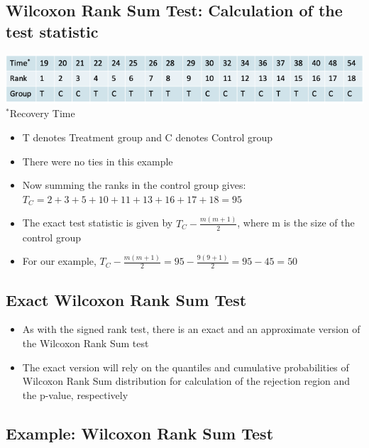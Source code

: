 \documentclass[
]{book}
\providecommand{\tightlist}{%
  \setlength{\itemsep}{0pt}\setlength{\parskip}{0pt}}
\begin{document}
\hypertarget{wilcoxon-rank-sum-test-calculation-of-the-test-statistic}{%
\subsection{Wilcoxon Rank Sum Test: Calculation of the test statistic}\label{wilcoxon-rank-sum-test-calculation-of-the-test-statistic}}

\includegraphics[width=1\linewidth]{./9_30}
\(^*\)Recovery Time

\begin{itemize}
\tightlist
\item
  T denotes Treatment group and C denotes Control group
\item
  There were no ties in this example
\item
  Now summing the ranks in the control group gives:\\
  \(T_C = 2 + 3 + 5 + 10 + 11 + 13 + 16 + 17 + 18 = 95\)
\item
  The exact test statistic is given by \(T_C-\frac{m(m+1)}{2}\), where m is the size of the control group
\item
  For our example, \(T_C-\frac{m(m+1)}{2}=95-\frac{9(9+1)}{2}=95-45=50\)
\end{itemize}

\hypertarget{exact-wilcoxon-rank-sum-test}{%
\subsection{Exact Wilcoxon Rank Sum Test}\label{exact-wilcoxon-rank-sum-test}}

\begin{itemize}
\tightlist
\item
  As with the signed rank test, there is an exact and an approximate version of the Wilcoxon Rank Sum test
\item
  The exact version will rely on the quantiles and cumulative probabilities of Wilcoxon Rank Sum distribution for calculation of the rejection region and the p-value, respectively
\end{itemize}

\hypertarget{example-wilcoxon-rank-sum-test}{%
\subsection{Example: Wilcoxon Rank Sum Test}\label{example-wilcoxon-rank-sum-test}}
\end{document}
